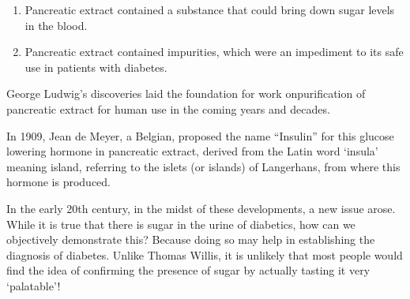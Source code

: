 \begin{enumerate}
\itemsep=0pt
\item Pancreatic extract contained a substance that could bring down sugar levels in the blood.
\item Pancreatic extract contained impurities, which were an impediment to its safe use in patients with diabetes.
\end{enumerate}

George Ludwig’s discoveries laid the foundation for work on\break purification of pancreatic extract for human use in the coming years and decades.

In 1909, Jean de Meyer, a Belgian, proposed the name “Insulin” for this glucose lowering hormone in pancreatic extract, derived from the Latin word ‘insula’ meaning island, referring to the islets (or islands) of Langerhans, from where this hormone is produced.

In the early 20th century, in the midst of these developments, a new issue arose. While it is true that there is sugar in the urine of diabetics, how can we objectively demonstrate this? Because doing so may help in establishing the diagnosis of diabetes. Unlike Thomas Willis, it is unlikely that most people would find the idea of confirming the presence of sugar by actually tasting it very ‘palatable’!

